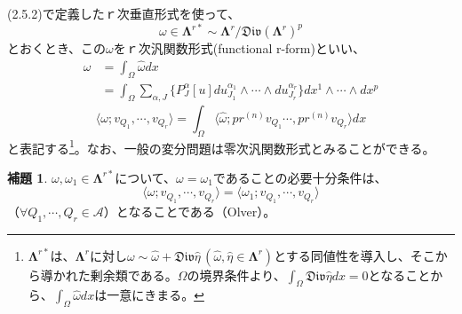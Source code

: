 \documentclass[a4paper, 11pt]{report}
\theoremstyle{definition}
\newtheorem{lemma}{補題}[section]
\begin{document}
 (2.5.2)で定義したｒ次垂直形式を使って、
\begin{equation*}
\omega \in \mathbf{\Lambda}^{r*} \sim \mathbf{\Lambda}^{r} / \mathfrak{Div}(\mathbf{\Lambda}^{r})^p
\end{equation*}
とおくとき、この$\omega$をｒ次汎関数形式(functional r-form)といい、
\begin{align}
\omega &= \int_\Omega \hat{\omega}dx \nonumber\\
&= \int_\Omega \sum_{\alpha,J} \{ P^\alpha_J[u]du^{\alpha_1}_{J_1} \wedge \cdots \wedge du^{\alpha_r}_{J_r} \} dx^1 \wedge \cdots \wedge dx^p %
\end{align}
\begin{equation*}
\langle \omega ;v_{Q_1}, \cdots, v_{Q_r}\rangle = \int_\Omega \langle \hat{\omega}; pr^{(n)}v_{Q_1} \cdots, pr^{(n)}v_{Q_r}\rangle dx \nonumber
\end{equation*}
と表記する\footnote{$\mathbf{\Lambda}^{r*}$は、$\mathbf{\Lambda}^{r}$に対し$\omega\sim\hat{\omega}+\mathfrak{Div}\hat{\eta} \, (\hat{\omega},\hat{\eta}\in\mathbf{\Lambda}^{r})$とする同値性を導入し、そこから導かれた剰余類である。$\Omega$の境界条件より、$\int_\Omega \mathfrak{Div}\hat{\eta}dx=0$となることから、$\int_\Omega\hat{\omega}dx$は一意にきまる。}。なお、一般の変分問題は零次汎関数形式とみることができる。

\begin{lemma}
 $\omega, \omega_1\in \mathbf{\Lambda}^{r*}$について、$\omega=\omega_1$であることの必要十分条件は、
\begin{equation*}
\langle \omega ;v_{Q_1}, \cdots, v_{Q_r}\rangle = \langle \omega_1 ;v_{Q_1}, \cdots, v_{Q_r}\rangle 
\end{equation*}
（$\forall Q_1,\cdots,Q_r\in \mathcal{A}$）となることである（Olver\cite[Chap.5]{Olver4}）。
\end{lemma}
\end{document}
